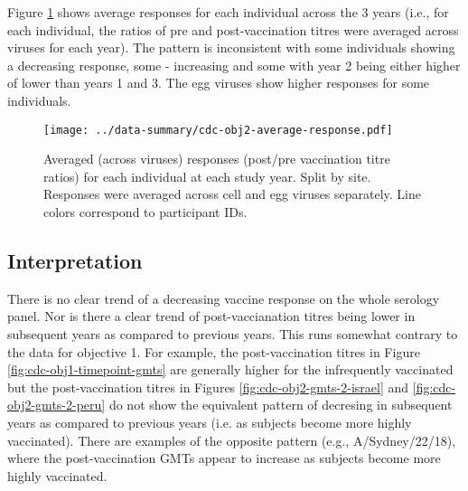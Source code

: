 \documentclass[12pt]{article}
\begin{document}
Figure \ref{fig:cdc-obj2-average-response} shows average responses for each individual across the 3 years (i.e., for each individual, the ratios of pre and post-vaccination titres were averaged across viruses for each year).
The pattern is inconsistent with some individuals showing a decreasing response,
some - increasing and some with year 2 being either higher of lower
than years 1 and 3.
The egg viruses show higher responses for some individuals.

\begin{figure}
	\texttt{[image: ../data-summary/cdc-obj2-average-response.pdf]}
	\caption{Averaged (across viruses) responses (post/pre vaccination titre ratios) for each individual at each study year. Split by site. Responses were averaged across cell and egg viruses separately. Line colors correspond to participant IDs.}
	\label{fig:cdc-obj2-average-response}
\end{figure}

\subsection{Interpretation}

There is no clear trend of a decreasing vaccine response on the whole serology
panel. Nor is there a clear trend of post-vaccianation titres being lower in subsequent years as compared to previous years. This runs somewhat contrary to
the data for objective 1. For example, the post-vaccination titres in Figure \ref{fig:cdc-obj1-timepoint-gmts} are generally higher for the infrequently vaccinated but the post-vaccination titres in Figures \ref{fig:cdc-obj2-gmts-2-israel} and \ref{fig:cdc-obj2-gmts-2-peru} do not show the equivalent pattern of decresing in subsequent years as compared to previous years (i.e. as subjects become more highly vaccinated). There are examples of the opposite pattern (e.g., A/Sydney/22/18), where the post-vaccination GMTs appear to increase as subjects become more highly vaccinated.
\end{document}
